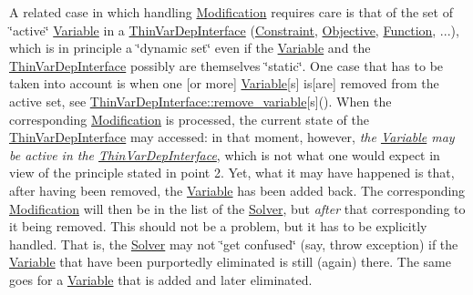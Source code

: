 \begin{DoxyEnumerate}
\item A related case in which handling \mbox{\hyperlink{class_s_m_spp__di__unipi__it_1_1_modification}{Modification}} requires care is that of the set of \char`\"{}active\char`\"{} \mbox{\hyperlink{class_s_m_spp__di__unipi__it_1_1_variable}{Variable}} in a \mbox{\hyperlink{class_s_m_spp__di__unipi__it_1_1_thin_var_dep_interface}{Thin\+Var\+Dep\+Interface}} (\mbox{\hyperlink{class_s_m_spp__di__unipi__it_1_1_constraint}{Constraint}}, \mbox{\hyperlink{class_s_m_spp__di__unipi__it_1_1_objective}{Objective}}, \mbox{\hyperlink{class_s_m_spp__di__unipi__it_1_1_function}{Function}}, ...), which is in principle a \char`\"{}dynamic set\char`\"{} even if the \mbox{\hyperlink{class_s_m_spp__di__unipi__it_1_1_variable}{Variable}} and the \mbox{\hyperlink{class_s_m_spp__di__unipi__it_1_1_thin_var_dep_interface}{Thin\+Var\+Dep\+Interface}} possibly are themselves \char`\"{}static\char`\"{}. One case that has to be taken into account is when one \mbox{[}or more\mbox{]} \mbox{\hyperlink{class_s_m_spp__di__unipi__it_1_1_variable}{Variable}}\mbox{[}s\mbox{]} is\mbox{[}are\mbox{]} removed from the active set, see \mbox{\hyperlink{group___thin_var_dep_interface___c_l_a_s_s_e_s_gad6726141a0cbe6a0410a2b396809dade}{Thin\+Var\+Dep\+Interface\+::remove\+\_\+variable}}\mbox{[}s\mbox{]}(). When the corresponding \mbox{\hyperlink{class_s_m_spp__di__unipi__it_1_1_modification}{Modification}} is processed, the current state of the \mbox{\hyperlink{class_s_m_spp__di__unipi__it_1_1_thin_var_dep_interface}{Thin\+Var\+Dep\+Interface}} may accessed\+: in that moment, however, {\itshape the \mbox{\hyperlink{class_s_m_spp__di__unipi__it_1_1_variable}{Variable}} may be active in the \mbox{\hyperlink{class_s_m_spp__di__unipi__it_1_1_thin_var_dep_interface}{Thin\+Var\+Dep\+Interface}}}, which is not what one would expect in view of the principle stated in point 2. Yet, what it may have happened is that, after having been removed, the \mbox{\hyperlink{class_s_m_spp__di__unipi__it_1_1_variable}{Variable}} has been added back. The corresponding \mbox{\hyperlink{class_s_m_spp__di__unipi__it_1_1_modification}{Modification}} will then be in the list of the \mbox{\hyperlink{class_s_m_spp__di__unipi__it_1_1_solver}{Solver}}, but {\itshape after} that corresponding to it being removed. This should not be a problem, but it has to be explicitly handled. That is, the \mbox{\hyperlink{class_s_m_spp__di__unipi__it_1_1_solver}{Solver}} may not \char`\"{}get confused\char`\"{} (say, throw exception) if the \mbox{\hyperlink{class_s_m_spp__di__unipi__it_1_1_variable}{Variable}} that have been purportedly eliminated is still (again) there. The same goes for a \mbox{\hyperlink{class_s_m_spp__di__unipi__it_1_1_variable}{Variable}} that is added and later eliminated.

\end{DoxyEnumerate}
